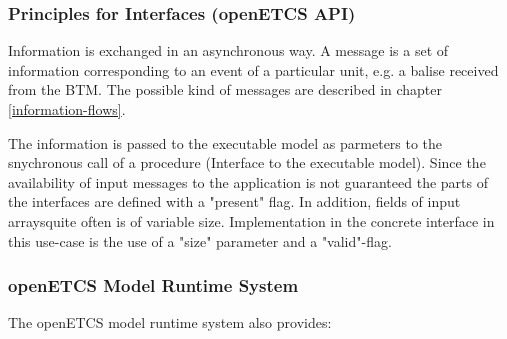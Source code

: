 \documentclass{template/openetcs_report}
\begin{document}
\subsubsection{Principles for Interfaces (openETCS \gls{API})}


Information  is exchanged  in an asynchronous way. A message is a set
of information corresponding to an event of a particular unit, e.g. a
balise received from the \gls{BTM}. The possible kind of messages are
described in chapter \ref{information-flows}.

The information is passed to the executable model as parmeters to the snychronous call of a procedure (Interface to the executable model). Since the availability of input messages to the application is not guaranteed the parts of the interfaces are defined with a "present" flag. In addition, fields of input arraysquite often is of variable size. Implementation in the concrete interface in this use-case is the use of a "size" parameter and a "valid"-flag.


\subsubsection{openETCS Model Runtime System}
The openETCS model runtime system also provides:
\end{document}
